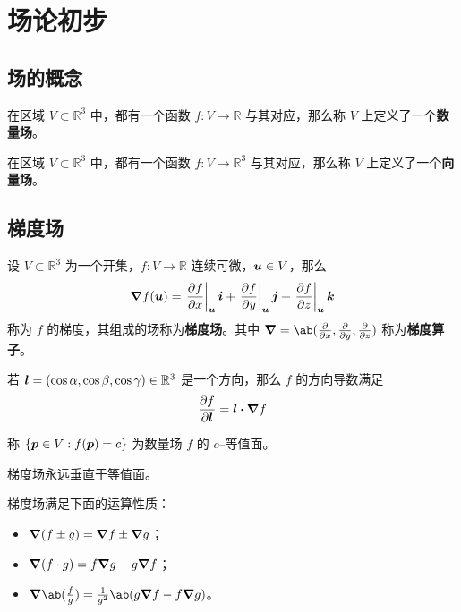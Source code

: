 \section{场论初步}

\subsection{场的概念}

\begin{definition}[数量场]
	在区域 $V \subset \mathbb{R}^{3}$ 中，都有一个函数 $f: V \to \mathbb{R}$ 与其对应，那么称 $V$ 上定义了一个\textbf{数量场}。
\end{definition}

\begin{definition}[向量场]
	在区域 $V \subset \mathbb{R}^{3}$ 中，都有一个函数 $f: V \to \mathbb{R}^{3}$ 与其对应，那么称 $V$ 上定义了一个\textbf{向量场}。
\end{definition}

\subsection{梯度场}

\begin{definition}[梯度场]
	设 $V \subset \mathbb{R}^{3}$ 为一个开集，$f: V \to \mathbb{R}$ 连续可微，$\boldsymbol{u} \in V$，那么
	$$
	\grad f(\vect{u}) = \eval{\pdv{f}{x}}_{\vect{u}} \vect{i} + \eval{\pdv{f}{y}}_{\vect{u}} \vect{j} + \eval{\pdv{f}{z}}_{\vect{u}} \vect{k}
	$$
	称为 $f$ 的梯度，其组成的场称为\textbf{梯度场}。其中 $\grad = \ab(\pdv{x}, \pdv{y}, \pdv{z})$ 称为\textbf{梯度算子}。
\end{definition}

若 $\boldsymbol{l} = (\cos \alpha, \cos \beta, \cos \gamma) \in \mathbb{R}^{3}$ 是一个方向，那么 $f$ 的方向导数满足
$$
\pdv{f}{\vect{l}} = \vect{l} \vdot \grad f
$$

\begin{definition}[等值面]
	称 $\{\boldsymbol{p} \in V: f(\boldsymbol{p}) = c\}$ 为数量场 $f$ 的 $c$--等值面。
\end{definition}

梯度场永远垂直于等值面。

梯度场满足下面的运算性质：
\begin{itemize}
	\item $\grad (f \pm g) = \grad f \pm \grad g$；
	\item $\grad (f \cdot g) = f \grad g + g \grad f$；
	\item $\grad \ab(\frac{f}{g}) = \frac{1}{g^2} \ab(g \grad f - f \grad g)$。
\end{itemize}

